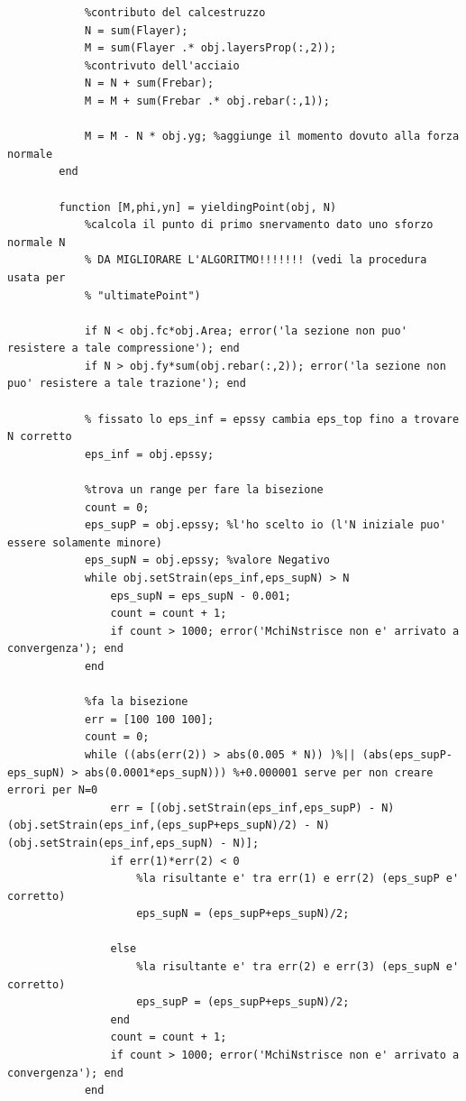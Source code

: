 \documentclass[10pt]{article}
\begin{document}
\begin{lstlisting}
            %contributo del calcestruzzo
            N = sum(Flayer);
            M = sum(Flayer .* obj.layersProp(:,2));
            %contrivuto dell'acciaio
            N = N + sum(Frebar);
            M = M + sum(Frebar .* obj.rebar(:,1));
            
            M = M - N * obj.yg; %aggiunge il momento dovuto alla forza normale
        end
        
        function [M,phi,yn] = yieldingPoint(obj, N)
            %calcola il punto di primo snervamento dato uno sforzo normale N
            % DA MIGLIORARE L'ALGORITMO!!!!!!! (vedi la procedura usata per
            % "ultimatePoint")
            
            if N < obj.fc*obj.Area; error('la sezione non puo' resistere a tale compressione'); end
            if N > obj.fy*sum(obj.rebar(:,2)); error('la sezione non puo' resistere a tale trazione'); end
            
            % fissato lo eps_inf = epssy cambia eps_top fino a trovare N corretto
            eps_inf = obj.epssy;
            
            %trova un range per fare la bisezione
            count = 0;
            eps_supP = obj.epssy; %l'ho scelto io (l'N iniziale puo' essere solamente minore)
            eps_supN = obj.epssy; %valore Negativo
            while obj.setStrain(eps_inf,eps_supN) > N
                eps_supN = eps_supN - 0.001;
                count = count + 1;
                if count > 1000; error('MchiNstrisce non e' arrivato a convergenza'); end
            end
            
            %fa la bisezione
            err = [100 100 100];
            count = 0;
            while ((abs(err(2)) > abs(0.005 * N)) )%|| (abs(eps_supP-eps_supN) > abs(0.0001*eps_supN))) %+0.000001 serve per non creare errori per N=0
                err = [(obj.setStrain(eps_inf,eps_supP) - N) (obj.setStrain(eps_inf,(eps_supP+eps_supN)/2) - N) (obj.setStrain(eps_inf,eps_supN) - N)];
                if err(1)*err(2) < 0
                    %la risultante e' tra err(1) e err(2) (eps_supP e' corretto)
                    eps_supN = (eps_supP+eps_supN)/2;
                    
                else
                    %la risultante e' tra err(2) e err(3) (eps_supN e' corretto)
                    eps_supP = (eps_supP+eps_supN)/2;
                end
                count = count + 1;
                if count > 1000; error('MchiNstrisce non e' arrivato a convergenza'); end
            end
            

\end{lstlisting}
\end{document}
